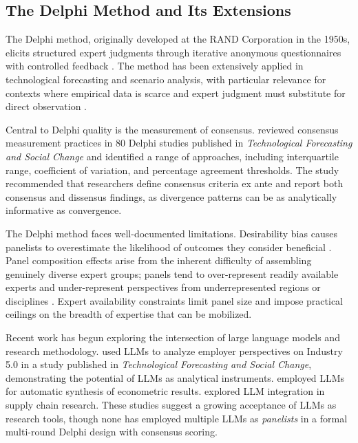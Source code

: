 \documentclass[preprint,review,12pt]{elsarticle}
\begin{document}
\subsection{The Delphi Method and Its Extensions}
\label{sec:delphi_method}

The Delphi method, originally developed at the RAND Corporation in the 1950s, elicits structured expert judgments through iterative anonymous questionnaires with controlled feedback \citep{gordon2006rtdelphi}. The method has been extensively applied in technological forecasting and scenario analysis, with particular relevance for contexts where empirical data is scarce and expert judgment must substitute for direct observation \citep{culot2020manufacturing, fritschy2019autonomous, stahl2023chatgpt}.

Central to Delphi quality is the measurement of consensus. \citet{vondergracht2012delphi} reviewed consensus measurement practices in 80 Delphi studies published in \textit{Technological Forecasting and Social Change} and identified a range of approaches, including interquartile range, coefficient of variation, and percentage agreement thresholds. The study recommended that researchers define consensus criteria ex ante and report both consensus and dissensus findings, as divergence patterns can be as analytically informative as convergence.

The Delphi method faces well-documented limitations. Desirability bias causes panelists to overestimate the likelihood of outcomes they consider beneficial \citep{ecken2011desirability}. Panel composition effects arise from the inherent difficulty of assembling genuinely diverse expert groups; panels tend to over-represent readily available experts and under-represent perspectives from underrepresented regions or disciplines \citep{foerster2014delphipanel, sokolov2025delphias}. Expert availability constraints limit panel size and impose practical ceilings on the breadth of expertise that can be mobilized.

Recent work has begun exploring the intersection of large language models and research methodology. \citet{grybauskas2024llm} used LLMs to analyze employer perspectives on Industry 5.0 in a study published in \textit{Technological Forecasting and Social Change}, demonstrating the potential of LLMs as analytical instruments. \citet{guo2026llmsynthesis} employed LLMs for automatic synthesis of econometric results. \citet{liu2026llmsupplychain} explored LLM integration in supply chain research. These studies suggest a growing acceptance of LLMs as research tools, though none has employed multiple LLMs as \textit{panelists} in a formal multi-round Delphi design with consensus scoring.
\end{document}
